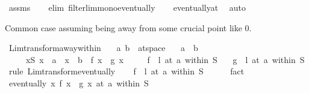 \begin{isabellebody}
\ assms\isanewline
\ \ \isamarkupfalse%
\ {\isacharparenleft}{\kern0pt}elim\ filterlim{\isacharunderscore}{\kern0pt}mono{\isacharunderscore}{\kern0pt}eventually{\isacharparenright}{\kern0pt}\isanewline
\ \ \isamarkupfalse%
\ eventually{\isacharunderscore}{\kern0pt}at\ \isamarkupfalse%
\ auto%
\endisatagproof
{\isafoldproof}%
%
\isadelimproof
%
\endisadelimproof
%
\begin{isamarkuptext}%
Common case assuming being away from some crucial point like 0.%
\end{isamarkuptext}\isamarkuptrue%
\isamarkupfalse%
\ Lim{\isacharunderscore}{\kern0pt}transform{\isacharunderscore}{\kern0pt}away{\isacharunderscore}{\kern0pt}within{\isacharcolon}{\kern0pt}\isanewline
\ \ \ a\ b\ {\isacharcolon}{\kern0pt}{\isacharcolon}{\kern0pt}\ {\isachardoublequoteopen}{\isacharprime}{\kern0pt}a{\isacharcolon}{\kern0pt}{\isacharcolon}{\kern0pt}t{}{\isacharunderscore}{\kern0pt}space{\isachardoublequoteclose}\isanewline
\ \ \ {\isachardoublequoteopen}a\ {\isasymnoteq}\ b{\isachardoublequoteclose}\isanewline
\ \ \ \ \ {\isachardoublequoteopen}{\isasymforall}x{\isasymin}S{\isachardot}{\kern0pt}\ x\ {\isasymnoteq}\ a\ {\isasymand}\ x\ {\isasymnoteq}\ b\ {\isasymlongrightarrow}\ f\ x\ {\isacharequal}{\kern0pt}\ g\ x{\isachardoublequoteclose}\isanewline
\ \ \ \ \ {\isachardoublequoteopen}{\isacharparenleft}{\kern0pt}f\ {\isasymlonglongrightarrow}\ l{\isacharparenright}{\kern0pt}\ {\isacharparenleft}{\kern0pt}at\ a\ within\ S{\isacharparenright}{\kern0pt}{\isachardoublequoteclose}\isanewline
\ \ \ {\isachardoublequoteopen}{\isacharparenleft}{\kern0pt}g\ {\isasymlonglongrightarrow}\ l{\isacharparenright}{\kern0pt}\ {\isacharparenleft}{\kern0pt}at\ a\ within\ S{\isacharparenright}{\kern0pt}{\isachardoublequoteclose}\isanewline
%
\isadelimproof
%
\endisadelimproof
%
\isatagproof
{}\isamarkupfalse%
\ {\isacharparenleft}{\kern0pt}rule\ Lim{\isacharunderscore}{\kern0pt}transform{\isacharunderscore}{\kern0pt}eventually{\isacharparenright}{\kern0pt}\isanewline
\ \ \isamarkupfalse%
\ {\isachardoublequoteopen}{\isacharparenleft}{\kern0pt}f\ {\isasymlonglongrightarrow}\ l{\isacharparenright}{\kern0pt}\ {\isacharparenleft}{\kern0pt}at\ a\ within\ S{\isacharparenright}{\kern0pt}{\isachardoublequoteclose}\isanewline
\ \ \ \ \isamarkupfalse%
\ fact\isanewline
\ \ \isamarkupfalse%
\ {\isachardoublequoteopen}eventually\ {\isacharparenleft}{\kern0pt}{\isasymlambda}x{\isachardot}{\kern0pt}\ f\ x\ {\isacharequal}{\kern0pt}\ g\ x{\isacharparenright}{\kern0pt}\ {\isacharparenleft}{\kern0pt}at\ a\ within\ S{\isacharparenright}{\kern0pt}{\isachardoublequoteclose}\isanewline

\end{isabellebody}
